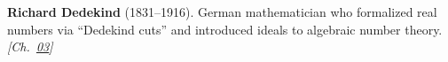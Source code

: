 \textbf{Richard Dedekind} (1831–1916). German mathematician who formalized real numbers via ``Dedekind cuts'' and introduced ideals to algebraic number theory. \emph{[Ch.~\hyperref[ch:banach]{03}]}

